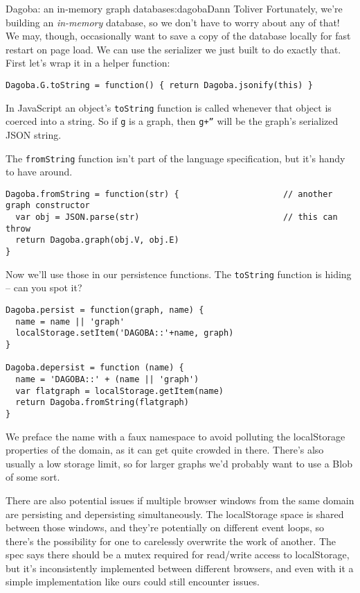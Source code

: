\begin{aosachapter}{Dagoba: an in-memory graph database}{s:dagoba}{Dann Toliver}
Fortunately, we're building an \emph{in-memory} database, so we don't
have to worry about any of that! We may, though, occasionally want to
save a copy of the database locally for fast restart on page load. We
can use the serializer we just built to do exactly that. First let's
wrap it in a helper function:

\begin{verbatim}
Dagoba.G.toString = function() { return Dagoba.jsonify(this) }
\end{verbatim}

In JavaScript an object's \texttt{toString} function is called whenever
that object is coerced into a string. So if \texttt{g} is a graph, then
\texttt{g+''} will be the graph's serialized JSON string.

The \texttt{fromString} function isn't part of the language
specification, but it's handy to have around.

\begin{verbatim}
Dagoba.fromString = function(str) {                     // another graph constructor
  var obj = JSON.parse(str)                             // this can throw
  return Dagoba.graph(obj.V, obj.E) 
}
\end{verbatim}

Now we'll use those in our persistence functions. The \texttt{toString}
function is hiding -- can you spot it?

\begin{verbatim}
Dagoba.persist = function(graph, name) {
  name = name || 'graph'
  localStorage.setItem('DAGOBA::'+name, graph)
}

Dagoba.depersist = function (name) {
  name = 'DAGOBA::' + (name || 'graph')
  var flatgraph = localStorage.getItem(name)
  return Dagoba.fromString(flatgraph)
}
\end{verbatim}

We preface the name with a faux namespace to avoid polluting the
localStorage properties of the domain, as it can get quite crowded in
there. There's also usually a low storage limit, so for larger graphs
we'd probably want to use a Blob of some sort.

There are also potential issues if multiple browser windows from the
same domain are persisting and depersisting simultaneously. The
localStorage space is shared between those windows, and they're
potentially on different event loops, so there's the possibility for one
to carelessly overwrite the work of another. The spec says there should
be a mutex required for read/write access to localStorage, but it's
inconsistently implemented between different browsers, and even with it
a simple implementation like ours could still encounter issues.


\end{aosachapter}
